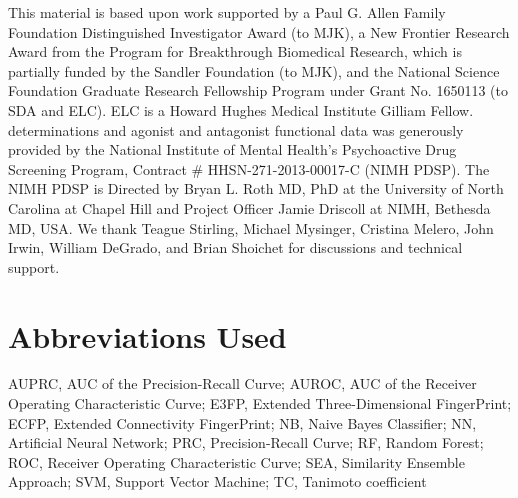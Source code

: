 \documentclass[../main.tex]{subfiles}
\begin{document}
\begin{refsection}
This material is based upon work supported by a Paul G.
Allen Family Foundation Distinguished Investigator Award (to MJK), a New Frontier Research Award from the Program for Breakthrough Biomedical Research, which is partially funded by the Sandler Foundation (to MJK), and the National Science Foundation Graduate Research Fellowship Program under Grant No.
1650113 (to SDA and ELC).
ELC is a Howard Hughes Medical Institute Gilliam Fellow.
\Ki{} determinations and agonist and antagonist functional data was generously provided by the National Institute of Mental Health's Psychoactive Drug Screening Program, Contract \# HHSN-271-2013-00017-C (NIMH PDSP).
The NIMH PDSP is Directed by Bryan L.
Roth MD, PhD at the University of North Carolina at Chapel Hill and Project Officer Jamie Driscoll at NIMH, Bethesda MD, USA.
We thank Teague Stirling, Michael Mysinger, Cristina Melero, John Irwin, William DeGrado, and Brian Shoichet for discussions and technical support.

\section*{Abbreviations Used}

AUPRC, AUC of the Precision-Recall Curve; AUROC, AUC of the Receiver Operating Characteristic Curve; E3FP, Extended Three-Dimensional FingerPrint; ECFP, Extended Connectivity FingerPrint; NB, Naive Bayes Classifier; NN, Artificial Neural Network; PRC, Precision-Recall Curve; RF, Random Forest; ROC, Receiver Operating Characteristic Curve; SEA, Similarity Ensemble Approach; SVM, Support Vector Machine; TC, Tanimoto coefficient

\printbibliography[heading=subbibintoc]
\end{refsection}
\end{document}
